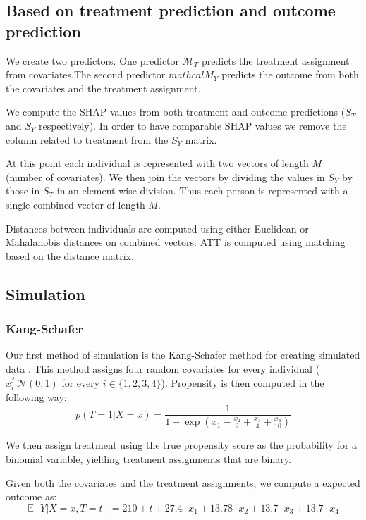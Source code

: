 \documentclass{article}
\begin{document}
\subsection{Based on treatment prediction and outcome prediction}
We create two predictors. One predictor $\mathcal{M}_T$ predicts the treatment assignment from covariates.The second predictor $mathcal{M}_Y$ predicts the outcome from both the covariates and the treatment assignment. 

We compute the SHAP values from both treatment and outcome predictions ($S_T$ and $S_Y$ respectively). In order to have comparable SHAP values we remove the column related to treatment from the $S_Y$ matrix. 

At this point each individual is represented with two vectors of length $M$ (number of covariates). We then join the vectors by dividing the values in $S_Y$ by those in $S_T$ in an element-wise division. Thus each person is represented with a single combined vector of length $M$.

Distances between individuals are computed using either Euclidean or Mahalanobis distances on combined vectors. ATT is computed using matching based on the distance matrix.

\subsection{Simulation}
\subsubsection{Kang-Schafer}
Our first method of simulation is the Kang-Schafer method for creating simulated data \cite{kang2007demystifying}. This method assigns four random covariates for every individual ($x_i^j~\mathcal{N}(0,1)$ for every $i\in{}\{1,2,3,4\}$). 
Propensity is then computed in the following way:
\begin{equation*}
    p(T=1| X=x) = \frac{1}{1 + \exp{(x_1 - \frac{x_2}{2} + \frac{x_3}{4} + \frac{x_4}{10})}}
\end{equation*}

We then assign treatment using the true propensity score as the probability for a binomial variable, yielding treatment assignments that are binary. 

Given both the covariates and the treatment assignments, we compute a expected outcome as:
\begin{equation*}
    \mathbb{E}[Y|X=x, T=t] = 210 + t + 27.4 \cdot{} x_1 + 13.78 \cdot{} x_2 + 13.7 \cdot{} x_3 + 13.7 \cdot{} x_4
\end{equation*}
\end{document}
